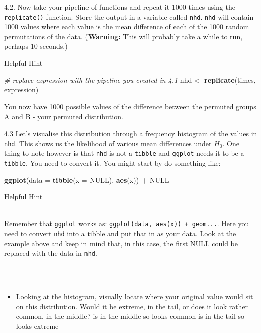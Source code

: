 \documentclass[]{book}
\newenvironment{Shaded}{\begin{snugshade}}{\end{snugshade}}
\newcommand{\CommentTok}[1]{\textcolor[rgb]{0.56,0.35,0.01}{\textit{#1}}}
\newcommand{\DataTypeTok}[1]{\textcolor[rgb]{0.13,0.29,0.53}{#1}}
\newcommand{\KeywordTok}[1]{\textcolor[rgb]{0.13,0.29,0.53}{\textbf{#1}}}
\newcommand{\NormalTok}[1]{#1}
\newcommand{\OperatorTok}[1]{\textcolor[rgb]{0.81,0.36,0.00}{\textbf{#1}}}
\newcommand{\OtherTok}[1]{\textcolor[rgb]{0.56,0.35,0.01}{#1}}
\newcommand{\StringTok}[1]{\textcolor[rgb]{0.31,0.60,0.02}{#1}}
\providecommand{\tightlist}{%
  \setlength{\itemsep}{0pt}\setlength{\parskip}{0pt}}
\newenvironment{info}
    {
    \hline\\
    }
    { 
    \\\\\hline
    }
\begin{document}
4.2. Now take your pipeline of functions and repeat it 1000 times using the \texttt{replicate()} function. Store the output in a variable called \texttt{nhd}. \texttt{nhd} will contain 1000 values where each value is the mean difference of each of the 1000 random permutations of the data. (\textbf{Warning:} This will probably take a while to run, perhaps 10 seconds.)

Helpful Hint

\begin{Shaded}
\begin{Highlighting}[]
\CommentTok{# replace expression with the pipeline you created in 4.1}
\NormalTok{nhd <-}\StringTok{ }\KeywordTok{replicate}\NormalTok{(times, expression)}
\end{Highlighting}
\end{Shaded}

You now have 1000 possible values of the difference between the permuted groups A and B - your permuted distribution.

4.3 Let's visualise this distribution through a frequency histogram of the values in \texttt{nhd}. This shows us the likelihood of various mean differences under \(H_0\). One thing to note however is that \texttt{nhd} is not a \texttt{tibble} and \texttt{ggplot} needs it to be a \texttt{tibble}. You need to convert it. You might start by do something like:

\begin{Shaded}
\begin{Highlighting}[]
\KeywordTok{ggplot}\NormalTok{(}\DataTypeTok{data =} \KeywordTok{tibble}\NormalTok{(}\DataTypeTok{x =} \OtherTok{NULL}\NormalTok{), }\KeywordTok{aes}\NormalTok{(x)) }\OperatorTok{+}\StringTok{ }\OtherTok{NULL}
\end{Highlighting}
\end{Shaded}

Helpful Hint

\begin{info}
Remember that \texttt{ggplot} works as:
\texttt{ggplot(data,\ aes(x))\ +\ geom...}. Here you need to convert
\texttt{nhd} into a tibble and put that in as your data. Look at the
example above and keep in mind that, in this case, the first NULL could
be replaced with the data in \texttt{nhd}.
\end{info}

\begin{itemize}
\tightlist
\item
  Looking at the histogram, visually locate where your original value would sit on this distribution. Would it be extreme, in the tail, or does it look rather common, in the middle? is in the middle so looks common is in the tail so looks extreme
\end{itemize}
\end{document}

